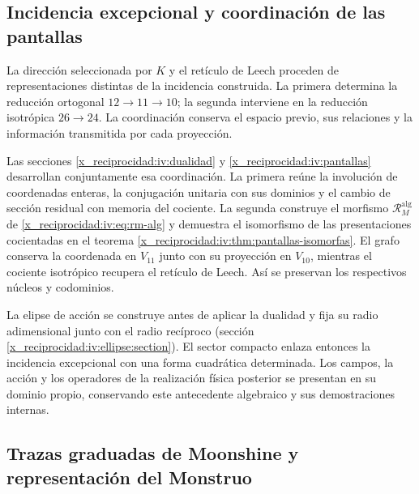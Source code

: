 


\subsection{Incidencia excepcional y coordinación de las pantallas}
\label{x_reciprocidad:exc:pantallas-dualidad}

La dirección seleccionada por \(K\) y el retículo de Leech proceden
de representaciones distintas de la incidencia construida. La primera
determina la reducción ortogonal \(12\to11\to10\); la segunda
interviene en la reducción isotrópica \(26\to24\). La coordinación
conserva el espacio previo, sus relaciones y la información transmitida
por cada proyección.

Las secciones \ref{x_reciprocidad:iv:dualidad} y \ref{x_reciprocidad:iv:pantallas} desarrollan
conjuntamente esa coordinación. La primera reúne la involución de
coordenadas enteras, la conjugación unitaria con sus dominios y el
cambio de sección residual con memoria del cociente. La segunda
construye el morfismo \(\mathcal R_M^{\mathrm{alg}}\) de
\eqref{x_reciprocidad:iv:eq:rm-alg} y demuestra el isomorfismo de las presentaciones
cocientadas en el teorema \ref{x_reciprocidad:iv:thm:pantallas-isomorfas}.
El grafo conserva la coordenada en \(V_{11}\) junto con su proyección
en \(V_{10}\), mientras el cociente isotrópico recupera el retículo
de Leech. Así se preservan los respectivos núcleos y codominios.

La elipse de acción se construye antes de aplicar la dualidad y fija
su radio adimensional junto con el radio recíproco
(sección \ref{x_reciprocidad:iv:ellipse:section}). El sector compacto enlaza entonces
la incidencia excepcional con una forma cuadrática determinada. Los
campos, la acción y los operadores de la realización física posterior
se presentan en su dominio propio, conservando este antecedente
algebraico y sus demostraciones internas.



\subsection{Trazas graduadas de Moonshine y representación del Monstruo}
\label{x_reciprocidad:exc:alcance}

